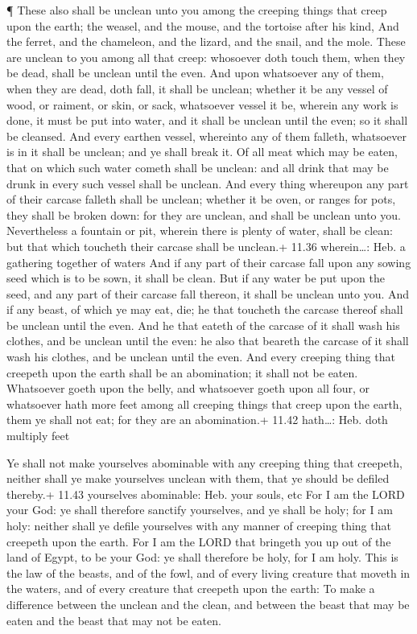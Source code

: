  ¶ These also shall be unclean unto you among the creeping
things that creep upon the earth; the weasel, and the mouse, and the
tortoise after his kind,  And the ferret, and the
chameleon, and the lizard, and the snail, and the mole. 
These are unclean to you among all that creep: whosoever doth touch
them, when they be dead, shall be unclean until the even. 
And upon whatsoever any of them, when they are dead, doth fall, it shall
be unclean; whether it be any vessel of wood, or raiment, or skin, or
sack, whatsoever vessel it be, wherein any work is done, it must be put
into water, and it shall be unclean until the even; so it shall be
cleansed.  And every earthen vessel, whereinto any of them
falleth, whatsoever is in it shall be unclean; and ye shall break it.
 Of all meat which may be eaten, that on which such water
cometh shall be unclean: and all drink that may be drunk in every such
vessel shall be unclean.  And every thing whereupon any
part of their carcase falleth shall be unclean; whether it be oven, or
ranges for pots, they shall be broken down: for they are unclean, and
shall be unclean unto you.  Nevertheless a fountain or pit,
wherein there is plenty of water, shall be clean: but that which
toucheth their carcase shall be unclean.+ 11.36 wherein\ldots: Heb. a
gathering together of waters  And if any part of their
carcase fall upon any sowing seed which is to be sown, it shall be
clean.  But if any water be put upon the seed, and any part
of their carcase fall thereon, it shall be unclean unto you.
 And if any beast, of which ye may eat, die; he that
toucheth the carcase thereof shall be unclean until the even.
 And he that eateth of the carcase of it shall wash his
clothes, and be unclean until the even: he also that beareth the carcase
of it shall wash his clothes, and be unclean until the even.
 And every creeping thing that creepeth upon the earth
shall be an abomination; it shall not be eaten.  Whatsoever
goeth upon the belly, and whatsoever goeth upon all four, or whatsoever
hath more feet among all creeping things that creep upon the earth, them
ye shall not eat; for they are an abomination.+ 11.42 hath\ldots: Heb.
doth multiply feet

 Ye shall not make yourselves abominable with any creeping
thing that creepeth, neither shall ye make yourselves unclean with them,
that ye should be defiled thereby.+ 11.43 yourselves abominable: Heb.
your souls, etc  For I am the LORD your God: ye shall
therefore sanctify yourselves, and ye shall be holy; for I am holy:
neither shall ye defile yourselves with any manner of creeping thing
that creepeth upon the earth.  For I am the LORD that
bringeth you up out of the land of Egypt, to be your God: ye shall
therefore be holy, for I am holy.  This is the law of the
beasts, and of the fowl, and of every living creature that moveth in the
waters, and of every creature that creepeth upon the earth:
 To make a difference between the unclean and the clean,
and between the beast that may be eaten and the beast that may not be
eaten.

